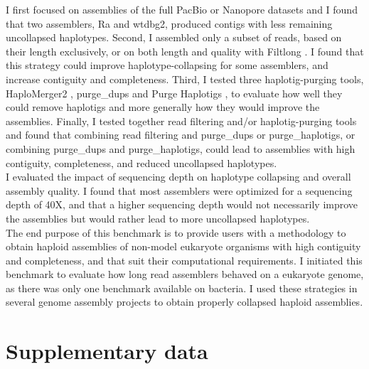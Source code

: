 I first focused on assemblies of the full PacBio or Nanopore datasets and I found that two assemblers, Ra and wtdbg2, produced contigs with less remaining uncollapsed haplotypes. Second, I assembled only a subset of reads, based on their length exclusively, or on both length and quality with Filtlong \cite{filtlong}. I found that this strategy could improve haplotype-collapsing for some assemblers, and increase contiguity and completeness. Third, I tested three haplotig-purging tools, HaploMerger2 \cite{haplomerger2}, purge\_dups \cite{purge_dups} and Purge Haplotigs \cite{purge_haplotigs}, to evaluate how well they could remove haplotigs and more generally how they would improve the assemblies. Finally, I tested together read filtering and/or haplotig-purging tools and found that combining read filtering and purge\_dups or purge\_haplotigs, or combining purge\_dups and purge\_haplotigs, could lead to assemblies with high contiguity, completeness, and reduced uncollapsed haplotypes. \\

I evaluated the impact of sequencing depth on haplotype collapsing and overall assembly quality. I found that most assemblers were optimized for a sequencing depth of 40X, and that a higher sequencing depth would not necessarily improve the assemblies but would rather lead to more uncollapsed haplotypes. \\

The end purpose of this benchmark is to provide users with a methodology to obtain haploid assemblies of non-model eukaryote organisms with high contiguity and completeness, and that suit their computational requirements. I initiated this benchmark to evaluate how long read assemblers behaved on a eukaryote genome, as there was only one benchmark available on bacteria. I used these strategies in several genome assembly projects to obtain properly collapsed haploid assemblies. \\

%

\beginsupplement

\section*{Supplementary data}

